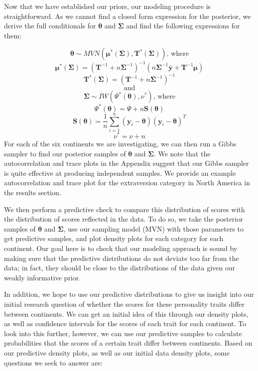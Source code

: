 \documentclass[
]{article}
\begin{document}
Now that we have established our priors, our modeling procedure is
straightforward. As we cannot find a closed form expression for the
posterior, we derive the full conditionals for \(\boldsymbol \theta\)
and \(\mathbf\Sigma\) and find the following expressions for them:

\[\boldsymbol{\theta} \sim MVN(\boldsymbol{\mu}^*(\mathbf{\Sigma}), \mathbf{T}^*(\mathbf{\Sigma})) \text{, where}\]
\[\boldsymbol{\mu}^*(\mathbf{\Sigma}) = (\mathbf{T}^{-1} + n \mathbf{\Sigma}^{-1})^{-1} (n \mathbf{\Sigma}^{-1} \bar{\mathbf{y}} + \mathbf{T}^{-1} \boldsymbol{\mu})\]
\[\mathbf{T}^*(\mathbf{\Sigma}) = (\mathbf{T}^{-1} + n\mathbf{\Sigma}^{-1})^{-1}\]
\[\text{and}\]
\[\mathbf{\Sigma} \sim IW(\Psi^* (\boldsymbol{\theta}), \nu^*) \text{, where}\]
\[\Psi^* (\boldsymbol{\theta}) = \Psi + n\mathbf{S}(\boldsymbol{\theta})\]
\[\mathbf{S}(\boldsymbol{\theta}) = \frac{1}{n} \sum_{i=1}^n (\mathbf{y}_i - \boldsymbol{\theta}) (\mathbf{y}_i - \boldsymbol{\theta})^T\]
\[\nu^* = \nu + n\] For each of the six continents we are investigating,
we can then run a Gibbs sampler to find our posterior samples of
\(\boldsymbol \theta\) and \(\mathbf \Sigma\). We note that the
autocorrelation and trace plots in the Appendix suggest that our Gibbs
sampler is quite effective at producing independent samples. We provide
an example autocorrelation and trace plot for the extraversion category
in North America in the results section.

We then perform a predictive check to compare this distribution of
scores with the distribution of scores reflected in the data. To do so,
we take the posterior samples of \(\boldsymbol \theta\) and
\(\mathbf \Sigma\), use our sampling model (MVN) with those parameters
to get predictive samples, and plot density plots for each category for
each continent. Our goal here is to check that our modeling approach is
sound by making sure that the predictive distributions do not deviate
too far from the data; in fact, they should be close to the
distributions of the data given our weakly informative prior.

In addition, we hope to use our predictive distributions to give us
insight into our initial research question of whether the scores for
these personality traits differ between continents. We can get an
initial idea of this through our density plots, as well as confidence
intervals for the scores of each trait for each continent. To look into
this further, however, we can use our predictive samples to calculate
probabilities that the scores of a certain trait differ between
continents. Based on our predictive density plots, as well as our
initial data density plots, some questions we seek to answer are:
\end{document}
